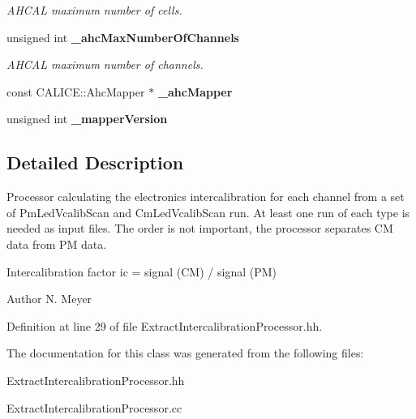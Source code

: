 \begin{DoxyCompactItemize}
\begin{DoxyCompactList}\small\item\em AHCAL maximum number of cells. \item\end{DoxyCompactList}\item 
unsigned int {\bf \_\-ahcMaxNumberOfChannels}\label{classExtractIntercalibrationProcessor_a693b0d0ebafc572ecffe39ce19b75c87}

\begin{DoxyCompactList}\small\item\em AHCAL maximum number of channels. \item\end{DoxyCompactList}\item 
const CALICE::AhcMapper $\ast$ {\bfseries \_\-ahcMapper}\label{classExtractIntercalibrationProcessor_ae81b815805190b458c244c540cc4f7c8}

\item 
unsigned int {\bfseries \_\-mapperVersion}\label{classExtractIntercalibrationProcessor_ac28474a6ef717635d3c79a4cb440821c}

\end{DoxyCompactItemize}


\subsection{Detailed Description}
Processor calculating the electronics intercalibration for each channel from a set of PmLedVcalibScan and CmLedVcalibScan run. At least one run of each type is needed as input files. The order is not important, the processor separates CM data from PM data.

Intercalibration factor ic = signal (CM) / signal (PM)

\begin{DoxyAuthor}{Author}
N. Meyer 
\end{DoxyAuthor}


Definition at line 29 of file ExtractIntercalibrationProcessor.hh.

The documentation for this class was generated from the following files:\begin{DoxyCompactItemize}
\item 
ExtractIntercalibrationProcessor.hh\item 
ExtractIntercalibrationProcessor.cc\end{DoxyCompactItemize}
